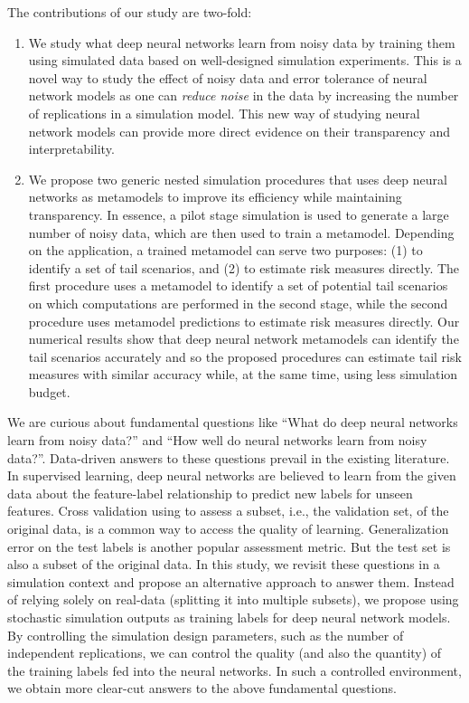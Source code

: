\documentclass{article}
\begin{document}
The contributions of our study are two-fold:
\begin{enumerate}
    \item We study what deep neural networks learn from noisy data by training them using simulated data based on well-designed simulation experiments.
    This is a novel way to study the effect of noisy data and error tolerance of neural network models as one can \textit{reduce noise} in the data by increasing the number of replications in a simulation model.
    This new way of studying neural network models can provide more direct evidence on their transparency and interpretability.  
    \item We propose two generic nested simulation procedures that uses deep neural networks as metamodels to improve its efficiency while maintaining transparency. 
    In essence, a pilot stage simulation is used to generate a large number of noisy data, which are then used to train a metamodel.
    Depending on the application, a trained metamodel can serve two purposes: (1) to identify a set of tail scenarios, and (2) to estimate risk measures directly.
    The first procedure uses a metamodel to identify a set of potential tail scenarios on which computations are performed in the second stage, while the second procedure uses metamodel predictions to estimate risk measures directly.
    Our numerical results show that deep neural network metamodels can identify the tail scenarios accurately and so the proposed procedures can estimate tail risk measures with similar accuracy while, at the same time, using less simulation budget.
\end{enumerate}

We are curious about fundamental questions like ``What do deep neural networks learn from noisy data?'' and ``How well do neural networks learn from noisy data?''.
Data-driven answers to these questions prevail in the existing literature.
In supervised learning, deep neural networks are believed to learn from the given data about the feature-label relationship to predict new labels for unseen features.
Cross validation using to assess a subset, i.e., the validation set, of the original data, is a common way to access the quality of learning.
Generalization error on the test labels is another popular assessment metric.
But the test set is also a subset of the original data.
In this study, we revisit these questions in a simulation context and propose an alternative approach to answer them.
Instead of relying solely on real-data (splitting it into multiple subsets), we propose using stochastic simulation outputs as training labels for deep neural network models.
By controlling the simulation design parameters, such as the number of independent replications, we can control the quality (and also the quantity) of the training labels fed into the neural networks.
In such a controlled environment, we obtain more clear-cut answers to the above fundamental questions.
\end{document}
